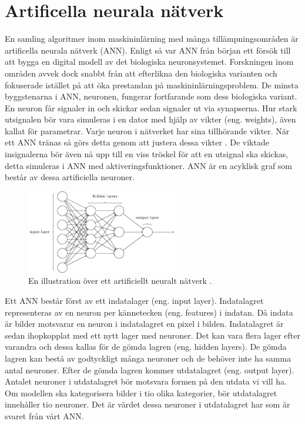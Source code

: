 \documentclass[]{kththesis}
\begin{document}
\section{Artificella neurala nätverk}
En samling algoritmer inom maskininlärning med många tillämpningsområden är artificella neurala nätverk (ANN). Enligt \textcite{Goodfellow-et-al-2016} så var ANN från början ett försök till att bygga en digital modell av det biologiska neuronsystemet. Forskningen inom områden avvek dock snabbt från att efterlikna den biologiska varianten och fokuserade istället på att öka prestandan på maskininlärningsproblem. De minsta byggstenarna i ANN, neuronen, fungerar fortfarande som dess biologiska variant. En neuron får signaler in och skickar sedan signaler ut via synapserna. Hur stark utsignalen bör vara simuleras i en dator med hjälp av vikter (eng. weights), även kallat för parametrar. Varje neuron i nätverket har sina tillhörande vikter. När ett ANN tränas så görs detta genom att justera dessa vikter \parencite{Goodfellow-et-al-2016}. De viktade insignalerna bör även nå upp till en viss tröskel för att en utsignal ska skickas, detta simuleras i ANN med aktiveringsfunktioner. ANN är en acyklisk graf som består av dessa artificiella neuroner.

\begin{figure}[h]
  \centering
  \includegraphics[width=0.6\textwidth]{nn}
  \caption{En illustration över ett artificiellt neuralt nätverk \parencite{nielsen2015neural}.}
\end{figure}

Ett ANN består först av ett indatalager (eng. input layer). Indatalagret representeras av en neuron per kännetecken (eng. features) i indatan. Då indata är bilder motsvarar en neuron i indatalagret en pixel i bilden. Indatalagret är sedan ihopkopplat med ett nytt lager med neuroner. Det kan vara flera lager efter varandra och dessa kallas för de gömda lagren (eng. hidden layers). De gömda lagren kan bestå av godtyckligt många neuroner och de behöver inte ha samma antal neuroner. Efter de gömda lagren kommer utdatalagret (eng. output layer). Antalet neuroner i utdatalagret bör motsvara formen på den utdata vi vill ha. Om modellen ska kategorisera bilder i tio olika kategorier, bör utdatalagret innehåller tio neuroner. Det är värdet dessa neuroner i utdatalagret har som är svaret från vårt ANN.
\end{document}
